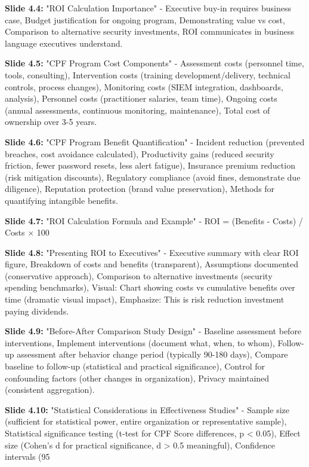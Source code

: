 \documentclass[11pt,a4paper]{article}
\begin{document}
\textbf{Slide 4.4:} "ROI Calculation Importance" - Executive buy-in requires business case, Budget justification for ongoing program, Demonstrating value vs cost, Comparison to alternative security investments, ROI communicates in business language executives understand.

\textbf{Slide 4.5:} "CPF Program Cost Components" - Assessment costs (personnel time, tools, consulting), Intervention costs (training development/delivery, technical controls, process changes), Monitoring costs (SIEM integration, dashboards, analysis), Personnel costs (practitioner salaries, team time), Ongoing costs (annual assessments, continuous monitoring, maintenance), Total cost of ownership over 3-5 years.

\textbf{Slide 4.6:} "CPF Program Benefit Quantification" - Incident reduction (prevented breaches, cost avoidance calculated), Productivity gains (reduced security friction, fewer password resets, less alert fatigue), Insurance premium reduction (risk mitigation discounts), Regulatory compliance (avoid fines, demonstrate due diligence), Reputation protection (brand value preservation), Methods for quantifying intangible benefits.

\textbf{Slide 4.7:} "ROI Calculation Formula and Example" - ROI = (Benefits - Costs) / Costs × 100%

\textbf{Slide 4.8:} "Presenting ROI to Executives" - Executive summary with clear ROI figure, Breakdown of costs and benefits (transparent), Assumptions documented (conservative approach), Comparison to alternative investments (security spending benchmarks), Visual: Chart showing costs vs cumulative benefits over time (dramatic visual impact), Emphasize: This is risk reduction investment paying dividends.

\textbf{Slide 4.9:} "Before-After Comparison Study Design" - Baseline assessment before interventions, Implement interventions (document what, when, to whom), Follow-up assessment after behavior change period (typically 90-180 days), Compare baseline to follow-up (statistical and practical significance), Control for confounding factors (other changes in organization), Privacy maintained (consistent aggregation).

\textbf{Slide 4.10:} "Statistical Considerations in Effectiveness Studies" - Sample size (sufficient for statistical power, entire organization or representative sample), Statistical significance testing (t-test for CPF Score differences, p < 0.05), Effect size (Cohen's d for practical significance, d > 0.5 meaningful), Confidence intervals (95%
\end{document}
